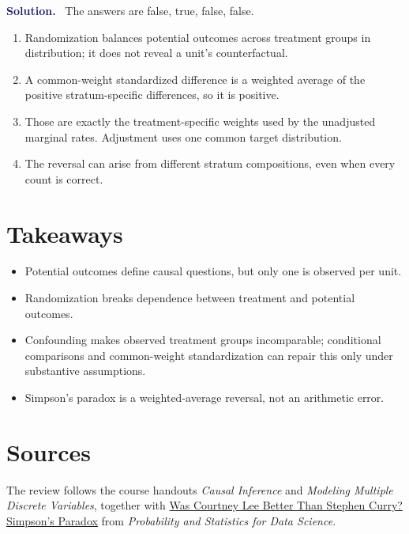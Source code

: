 \documentclass[11pt]{article}
\newenvironment{answer}{%
    \par\medskip\noindent\textcolor{MidnightBlue}{\textbf{Solution.}}\ }
    {\par\medskip}
\begin{document}
\begin{answer}
The answers are false, true, false, false.
\begin{enumerate}[label=(\alph*),itemsep=0.35em]
  \item Randomization balances potential outcomes across treatment groups in
        distribution; it does not reveal a unit's counterfactual.
  \item A common-weight standardized difference is a weighted average of the
        positive stratum-specific differences, so it is positive.
  \item Those are exactly the treatment-specific weights used by the unadjusted
        marginal rates. Adjustment uses one common target distribution.
  \item The reversal can arise from different stratum compositions, even when
        every count is correct.
\end{enumerate}
\end{answer}

\section*{Takeaways}
\begin{itemize}[leftmargin=1.6em,itemsep=0.25em]
  \item Potential outcomes define causal questions, but only one is observed per unit.
  \item Randomization breaks dependence between treatment and potential outcomes.
  \item Confounding makes observed treatment groups incomparable; conditional
        comparisons and common-weight standardization can repair this only under
        substantive assumptions.
  \item Simpson's paradox is a weighted-average reversal, not an arithmetic error.
\end{itemize}

\section*{Sources}
The review follows the course handouts \emph{Causal Inference} and
\emph{Modeling Multiple Discrete Variables}, together with
\href{https://github.com/cfgranda/ps4ds/blob/main/slides/multiple%20discrete%20variables/simpsons_paradox_handout.pdf}{Was Courtney Lee Better Than Stephen Curry? Simpson's Paradox}
from \emph{Probability and Statistics for Data Science}.
\end{document}
